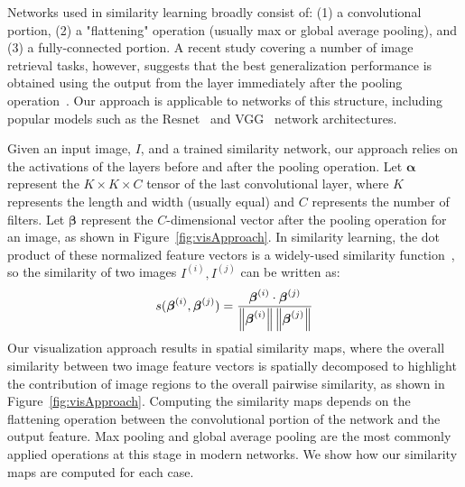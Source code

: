 Networks used in similarity learning broadly consist of: (1) a convolutional portion, (2) a "flattening" operation (usually max or global average pooling), and (3) a fully-connected portion. A recent study covering a number of image retrieval tasks, however, suggests that the best generalization performance is obtained using the output from the layer immediately after the pooling operation~\cite{vo2018generalization}. Our approach is applicable to networks of this structure, including popular models such as the Resnet~\cite{resnet} and VGG~\cite{vggfaces} network architectures.  

Given an input image, $I$, and a trained similarity network, our approach relies on the activations of the layers before and after the pooling operation. Let $\boldsymbol{\alpha}$ represent the $K \times K \times C$ tensor of the last convolutional layer, where $K$ represents the length and width (usually equal) and $C$ represents the number of filters. Let $\boldsymbol{\beta}$ represent the $C$-dimensional vector after the pooling operation for an image, as shown in Figure~\ref{fig:visApproach}. In similarity learning, the dot product of these normalized feature vectors is a widely-used similarity function~\cite{bell2015learning,Proxy,schroff2015facenet,sun2014deep,wang2014learning,yi2014deep}, so the similarity of two images $I^{(i)},I^{(j)}$ can be written as:
\begin{equation}
s(\boldsymbol{\beta}^{(i)},\boldsymbol{\beta}^{(j)}) = \frac{\boldsymbol{\beta}^{(i)} \cdot \boldsymbol{\beta}^{(j)}}{\left\lVert\boldsymbol{\beta}^{(i)}\right\rVert \left\lVert\boldsymbol{\beta}^{(j)}\right\rVert}
\label{eq:cosineSim}
\end{equation}
Our visualization approach results in spatial similarity maps, where the overall similarity between two image feature vectors is spatially decomposed to highlight the contribution of image regions to the overall pairwise similarity, as shown in Figure~\ref{fig:visApproach}. Computing the similarity maps depends on the flattening operation between the convolutional portion of the network and the output feature. Max pooling and global average pooling are the most commonly applied operations at this stage in modern networks. We show how our similarity maps are computed for each case.

